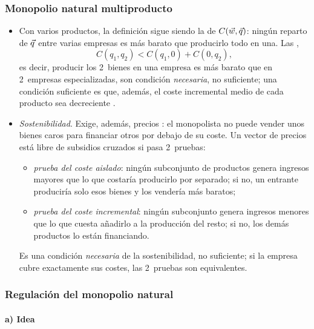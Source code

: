 \documentclass[11pt]{article}
\begin{document}
\subsubsection{Monopolio natural multiproducto}\label{sec:monopolio-natural-multiproducto}

\begin{itemize}
\item Con varios productos, la definición sigue siendo la  de $C(\vec{w},\vec{q})$: ningún reparto de $\vec{q}$ entre varias empresas es más barato que producirlo todo en una. Las ,
  \begin{equation}
  C(q_1,q_2)<C(q_1,0)+C(0,q_2),
  \end{equation}
  es decir, producir los 2~bienes en una empresa es más barato que en 2~empresas especializadas, son condición \emph{necesaria}, no suficiente; una condición suficiente es que, además, el coste incremental medio de cada producto sea decreciente\nocite{BaumolPanzarWillig1982Contestable} .
\item \emph{Sostenibilidad}. Exige, además, precios \nocite{Faulhaber1975Cross}: el monopolista no puede vender unos bienes caros para financiar otros por debajo de su coste. Un vector de precios está libre de subsidios cruzados si pasa 2~pruebas:
  \begin{itemize}
  \item \emph{prueba del coste aislado}: ningún subconjunto de productos genera ingresos mayores que lo que costaría producirlo por separado; si no, un entrante produciría solo esos bienes y los vendería más baratos;
  \item \emph{prueba del coste incremental}: ningún subconjunto genera ingresos menores que lo que cuesta añadirlo a la producción del resto; si no, los demás productos lo están financiando.
  \end{itemize}
  Es una condición \emph{necesaria} de la sostenibilidad, no suficiente; si la empresa cubre exactamente sus costes, las 2~pruebas son equivalentes.
\end{itemize}

\subsubsection{Regulación del monopolio natural}\label{sec:regulacion-monopolio-natural}

\paragraph{a) Idea}
\end{document}
